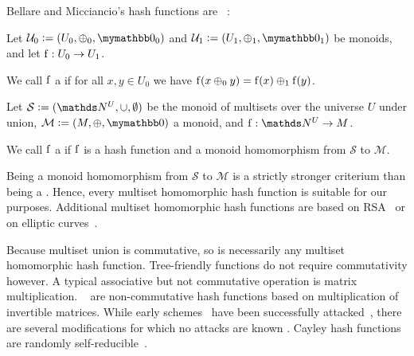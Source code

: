 \documentclass[conference]{IEEEtran}
\begin{document}
Bellare and Micciancio's hash functions are ~\cite{clarke2003incremental}:

\begin{definition}
Let $\mathcal{U}_0 \defeq (U_0, \groupaddsym_0, \neutraladd_0)$ and $\mathcal{U}_1 \defeq (U_1, \groupaddsym_1, \neutraladd_1)$ be monoids, and let ${\operatorname{f}}: {U_0} \rightarrow {U_1}$.

We call $\operatorname{f}$ a  if for all $x, y \in U_0$ we have $\operatorname{f}(x \oplus_0 y) = \operatorname{f}(x) \oplus_1 \operatorname{f}(y)$.
\end{definition}

\begin{definition}
Let $\mathcal{S} \defeq (\N^U, \cup, \emptyset)$ be the monoid of multisets over the universe $U$ under union, $\mathcal{M} \defeq (M, \groupaddsym, \neutraladd)$ a monoid, and $\fun{\f}{\N^U}{M}$.

We call $\operatorname{f}$ a  if $\operatorname{f}$ is a hash function and a monoid homomorphism from $\mathcal{S}$ to $\mathcal{M}$.
\end{definition}

Being a monoid homomorphism from $\mathcal{S}$ to $\mathcal{M}$ is a strictly stronger criterium than being a \somewhatmorphism{}. Hence, every multiset homomorphic hash function is suitable for our purposes. Additional multiset homomorphic hash functions are based on RSA~\cite{cathalo2009comparing} or on elliptic curves~\cite{maitin2017elliptic}.

Because multiset union is commutative, so is necessarily any multiset homomorphic hash function. Tree-friendly functions do not require commutativity however. A typical associative but not commutative operation is matrix multiplication. ~\cite{zemor1991hash}\cite{petit2011rubik} are non-commutative hash functions based on multiplication of invertible matrices. While early schemes~\cite{tillich1994hashing} have been successfully attacked~\cite{grassl2011cryptanalysis}\cite{petit2010preimages}, there are several modifications for which no attacks are known \cite{petit2009graph}\cite{bromberg2017navigating}\cite{sosnovski2016cayley}. Cayley hash functions are randomly self-reducible~\cite{mullan2016text}.

\end{document}
